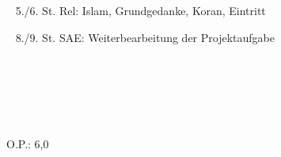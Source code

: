 {{	\textbullet~ 5./6. St. Rel: Islam, Grundgedanke, Koran, Eintritt\par
	\textbullet~ 8./9. St. SAE: Weiterbearbeitung der Projektaufgabe\par
	\textbullet~ \par
	\textbullet~ \par
	\textbullet~ 
	}{}{O.P.: 6,0}
}{}
\Unterschrift
\newpage

